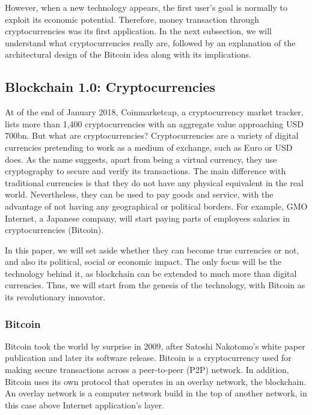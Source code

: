 However, when a new technology appears, the first user's goal is normally to exploit its economic potential. Therefore, money transaction through cryptocurrencies was its first application. In the next subsection, we will understand what cryptocurrencies really are, followed by an explanation of the architectural design of the Bitcoin idea along with its implications.

\subsection{Blockchain 1.0: Cryptocurrencies}

At of the end of January 2018, Coinmarketcap, a cryptocurrency market tracker, lists more than 1,400 cryptocurrencies with an aggregate value approaching USD 700bn.  But what are cryptocurrencies? Cryptocurrencies are a variety of digital currencies pretending to work as a medium of exchange, such as Euro or USD does. As the name suggests, apart from being a virtual currency, they use cryptography to secure and verify its transactions. The main difference with traditional currencies is that they do not have any physical equivalent in the real world. Nevertheless, they can be used to pay goods and service, with the advantage of not having any geographical or political borders. For example, GMO Internet, a Japanese company, will start paying parts of employees salaries in cryptocurrencies (Bitcoin).

In this paper, we will set aside whether they can become true currencies or not, and also its political, social or economic impact. The only focus will be the technology behind it, as blockchain can be extended to much more than digital currencies. Thus, we will start from the genesis of the technology, with Bitcoin as its revolutionary innovator.


\subsubsection{Bitcoin}

Bitcoin took the world by surprise in 2009, after Satoshi Nakotomo's white paper publication \cite{nakamoto2008bitcoin} and later its software release. Bitcoin is a cryptocurrency used for making secure transactions across a peer-to-peer (P2P) network. In addition, Bitcoin uses its own protocol that operates in an overlay network, the blockchain. An overlay network is a computer network build in the top of another network, in this case above Internet application's layer.

